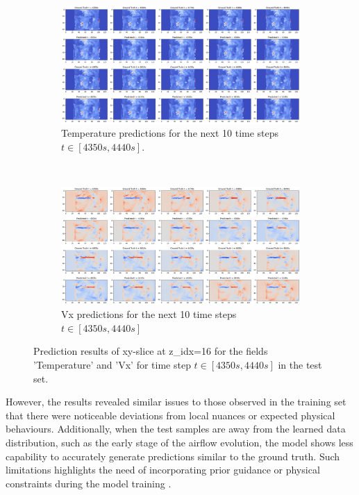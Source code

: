 \documentclass[final-report]{article-template}
\begin{document}
\begin{figure}[!htb]
    \centering
    \begin{subfigure}[t]{\textwidth}
        \centering
        \includegraphics[width=\textwidth]{figures/temp_10_4350.png}
        \caption{Temperature predictions for the next 10 time steps $t \in [4350s, 4440s]$.}
        \label{fig:pred_results_test_temp}
    \end{subfigure} \\[8mm]
    \begin{subfigure}[t]{\textwidth}
        \centering
        \includegraphics[width=\textwidth]{figures/vx_10_4350.png}
        \caption{Vx predictions for the next 10 time steps $t \in [4350s, 4440s]$}
    \end{subfigure}
    \caption{Prediction results of xy-slice at z\_idx=16 for the fields 'Temperature' and 'Vx' for time step $t \in [4350s, 4440s]$ in the test set.}
    \label{fig:pred_results_test}
\end{figure}

However, the results revealed similar issues to those observed in the training set that there were noticeable deviations from local nuances or expected physical behaviours. Additionally, when the test samples are away from the learned data distribution, such as the early stage of the airflow evolution, the model shows less capability to accurately generate predictions similar to the ground truth. Such limitations highlights the need of incorporating prior guidance or physical constraints during the model training \cite{gao2024prediff, bian2024diffusion}.\\
\end{document}
